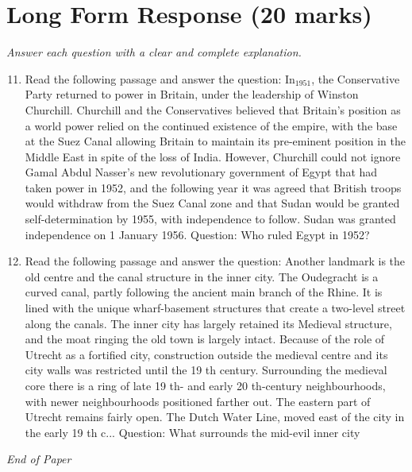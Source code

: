 \documentclass[12pt]{article}
\begin{document}
\section*{Long Form Response (20 marks)}
\textit{Answer each question with a clear and complete explanation.}
\begin{enumerate}[label=\arabic*.]
\setcounter{enumi}{10}
\item Read the following passage and answer the question: In$_{1951}$, the Conservative Party returned to power in Britain, under the leadership of Winston Churchill. Churchill and the Conservatives believed that Britain's position as a world power relied on the continued existence of the empire, with the base at the Suez Canal allowing Britain to maintain its pre-eminent position in the Middle East in spite of the loss of India. However, Churchill could not ignore Gamal Abdul Nasser's new revolutionary government of Egypt that had taken power in 1952, and the following year it was agreed that British troops would withdraw from the Suez Canal zone and that Sudan would be granted self-determination by 1955, with independence to follow. Sudan was granted independence on 1 January 1956. Question: Who ruled Egypt in 1952?
\item Read the following passage and answer the question: Another landmark is the old centre and the canal structure in the inner city. The Oudegracht is a curved canal, partly following the ancient main branch of the Rhine. It is lined with the unique wharf-basement structures that create a two-level street along the canals. The inner city has largely retained its Medieval structure, and the moat ringing the old town is largely intact. Because of the role of Utrecht as a fortified city, construction outside the medieval centre and its city walls was restricted until the 19 th century. Surrounding the medieval core there is a ring of late 19 th- and early 20 th-century neighbourhoods, with newer neighbourhoods positioned farther out. The eastern part of Utrecht remains fairly open. The Dutch Water Line, moved east of the city in the early 19 th c... Question: What surrounds the mid-evil inner city
\end{enumerate}

\vfill
\noindent\textit{End of Paper}
\end{document}
